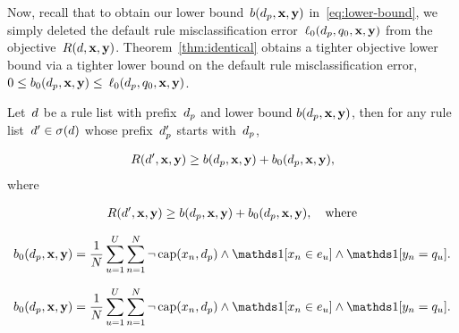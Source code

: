 Now, recall that to obtain our lower bound~${b(d_p, \mathbf{x}, \mathbf{y})}$
in~\eqref{eq:lower-bound}, we simply deleted the
default rule misclassification error~$\ell_0(d_p, q_0, \mathbf{x}, \mathbf{y})$
from the objective~${R({d}, \mathbf{x}, \mathbf{y})}$.
%
Theorem~\ref{thm:identical} obtains a tighter objective lower bound
via a tighter lower bound on the default rule misclassification error,
${0 \le b_0(d_p, \mathbf{x}, \mathbf{y}) \le}$ $\ell_0(d_p, q_0, \mathbf{x}, \mathbf{y})$.

\begin{theorem}
\label{thm:identical}
Let~${d}$ be a rule list with prefix~$d_p$
and lower bound ${b(d_p, \mathbf{x}, \mathbf{y})}$,
then for any rule list~${{d}' \in \sigma({d})}$
whose prefix~$d_p'$ starts with~$d_p$,
\begin{arxiv}
\begin{align}
R({d}', \mathbf{x}, \mathbf{y}) \ge b(d_p, \mathbf{x}, \mathbf{y}) + b_0(d_p, \mathbf{x}, \mathbf{y}),
\label{eq:identical}
\end{align}
where
\end{arxiv}
\begin{kdd}
\begin{align}
R({d}', \mathbf{x}, \mathbf{y}) \ge b(d_p, \mathbf{x}, \mathbf{y}) + b_0(d_p, \mathbf{x}, \mathbf{y}), \quad \text{where}
\end{align}
\end{kdd}
\begin{arxiv}
\begin{align}
b_0(\Prefix, \x, \y) = \frac{1}{N} \sum_{u=1}^U \sum_{n=1}^N
    \neg\, \Cap(x_n, \Prefix) \wedge \one [ x_n \in e_u ] \wedge \one [ y_n = q_u ].
\label{eq:lb-b0}
\end{align}
\end{arxiv}
\begin{kdd}
\begin{align}
b_0(\Prefix, \x, \y) = \frac{1}{N} \sum_{u=1}^U \sum_{n=1}^N
    \neg\, \Cap(x_n, \Prefix) \wedge \one [ x_n \in e_u ] \wedge \one [ y_n = q_u ]. \nn
\end{align}
\end{kdd}
\end{theorem}

